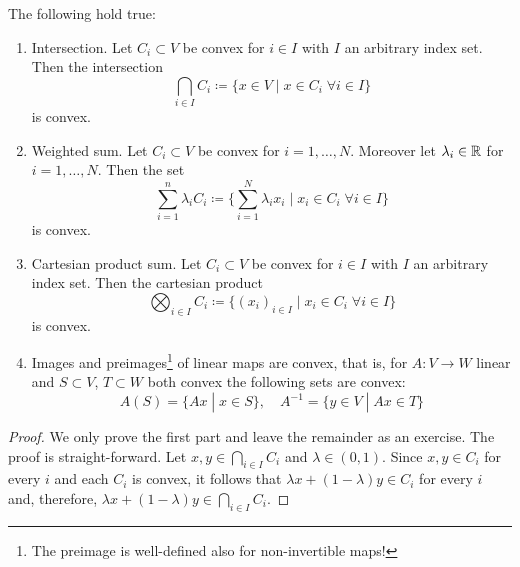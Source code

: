 \begin{lemma}\label{convexity:lemma:ops preserving convexity}
    The following hold true:
    \begin{enumerate}
        \item Intersection. Let $C_i\subset V$ be convex for $i\in I$ with $I$ an arbitrary index set. Then the intersection
        \begin{equation}
            \bigcap_{i\in I} C_i \coloneqq \{x\in V\;|\; x\in C_i\; \forall i\in I\}
        \end{equation}
        is convex.
        \item Weighted sum. Let $C_i\subset V$ be convex for $i=1,\dots, N$. Moreover let $\lambda_i \in \mathbb{R}$ for $i=1,\dots, N$. Then the set
        \begin{equation}
            \sum_{i=1}^n \lambda_i C_i \coloneqq \bigg\{\sum_{i=1}^N \lambda_i x_i\;|\; x_i\in C_i\; \forall i\in I\bigg\}
        \end{equation}
        is convex.
        \item Cartesian product sum. Let $C_i\subset V$ be convex for $i\in I$ with $I$ an arbitrary index set. Then the cartesian product
        \begin{equation}
            \bigotimes_{i\in I} C_i \coloneqq \{(x_i)_{i\in I}\;|\; x_i\in C_i\; \forall i\in I\}
        \end{equation}
        is convex.
        \item Images and preimages\footnote{The preimage is well-defined also for non-invertible maps!} of linear maps are convex, that is, for $A:V\rightarrow W$ linear and $S\subset V$, $T\subset W$ both convex the following sets are convex:
        \begin{equation}
            A(S) = \{Ax \;|\; x\in S\},\quad A^{-1}= \{y\in V\;|\; Ax \in T\}
        \end{equation}
    \end{enumerate}
\end{lemma}
\begin{proof}
    We only prove the first part and leave the remainder as an exercise. The proof is straight-forward. Let $x,y\in \bigcap_{i\in I} C_i$ and $\lambda\in (0,1)$. Since $x,y\in C_i$ for every $i$ and each $C_i$ is convex, it follows that $\lambda x + (1-\lambda)y \in C_i$ for every $i$ and, therefore, $\lambda x + (1-\lambda)y \in \bigcap_{i\in I} C_i$.
\end{proof}

